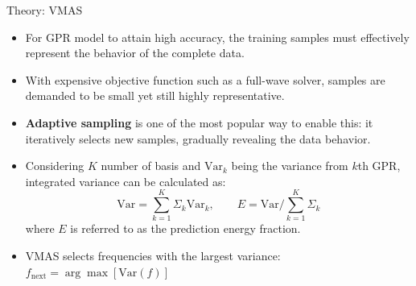 \begin{frame} {Theory: VMAS}

  \begin{itemize}
  \item For GPR model to attain high accuracy, the training samples must effectively represent the behavior of the complete data.
  \item With expensive objective function such as a full-wave solver, samples are demanded to be small yet still highly representative.
  \item \textbf{Adaptive sampling} is one of the most popular way to enable this: it iteratively selects new samples, gradually revealing the data behavior.
  \item Considering $K$ number of basis and $\mathrm{Var}_k$ being the variance from $k$th GPR, integrated variance can be calculated as:
  \[ \mathrm{Var} = \sum_{k=1}^{K} \Sigma_k \mathrm{Var}_k, \qquad E = \mathrm{Var} \Big/ \sum_{k=1}^{K} \Sigma_k \]
  where $E$ is referred to as the prediction energy fraction.
  \item VMAS selects frequencies with the largest variance: $f_\mathrm{next} = \arg\max {\left[\mathrm{Var}(f)\right]}$
\end{itemize}

\end{frame}